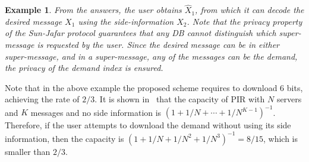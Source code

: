 \documentclass[letterpaper, 10 pt, conference]{ieeeconf}
\newcommand\salim[1]{\add[salim]{#1}}
\newcommand\swanand[1]{\notee[swanand]{#1}}
\newtheorem{example}{Example}
\newcommand{\Xj}[1]{X_{#1}} %
\begin{document}
\begin{example}

From the answers, the user obtains $\hat{X}_1$, from which it can decode the desired message $X_1$ using the side-information $X_2$. Note that the privacy property of the Sun-Jafar protocol guarantees that any DB cannot distinguish  which super-message is requested by the user. Since the desired message can be in either super-message, and in a super-message, any of the messages can be the demand, the privacy of the demand index is ensured. 
\end{example}

Note that in the above example the proposed scheme requires to download $6$ bits, achieving the rate of $2/3$. It is shown in~\cite[Theorem 1]{sun2016capacitynoncol} that  the capacity of PIR with $N$ servers and $K$ messages and no side information is $(1 + 1/N + \cdots + 1/N^{K-1})^{-1}$. Therefore, if the user attempts to download the demand without using its side information, then the capacity is $(1 + 1/N + 1/N^2 + 1/N^3)^{-1} = 8/15$, which is smaller than $2/3$. 
\end{document}
